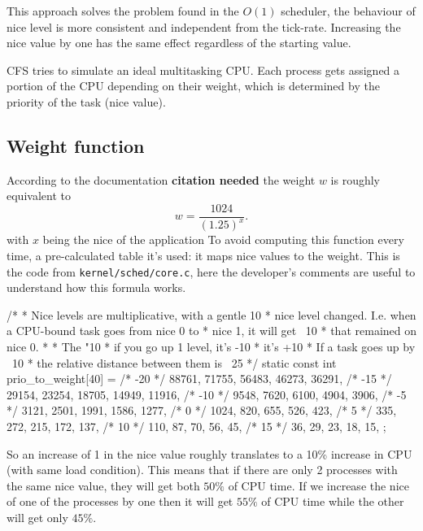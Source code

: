 \documentclass[10pt, oneside]{book}
\newcommand{\mycomment}[1]{\textbf{#1}}  %
\begin{document}
This approach solves the problem found in the $O(1)$ scheduler, the behaviour of nice level is more consistent and independent from the tick-rate. Increasing the nice value by one has the same effect regardless of the starting value.

CFS tries to simulate an ideal multitasking CPU. Each process gets
assigned a portion of the CPU depending on their weight, which is
determined by the priority of the task (nice value).

\subsection{Weight function}
According to the documentation \mycomment{citation needed} the weight
$w$ is roughly equivalent to
\begin{equation}
  w = \dfrac{1024}{(1.25)^{x}}.
  \label{eq:weight_nice}
\end{equation}
with $x$ being the nice of the application To avoid computing this
function every time, a pre-calculated table it's used: it maps nice
values to the weight. This is the code from
\verb|kernel/sched/core.c|, here the developer's comments are useful
to understand how this formula works.
\begin{code}
/*
 * Nice levels are multiplicative, with a gentle 10%
 * nice level changed. I.e. when a CPU-bound task goes from nice 0 to
 * nice 1, it will get ~10%
 * that remained on nice 0.
 *
 * The "10%
 * if you go up 1 level, it's -10%
 * it's +10%
 * If a task goes up by ~10%
 * the relative distance between them is ~25%
 */
static const int prio_to_weight[40] = {
/* -20 */ 88761, 71755, 56483, 46273, 36291,
/* -15 */ 29154, 23254, 18705, 14949, 11916,
/* -10 */ 9548, 7620, 6100, 4904, 3906,
/* -5 */ 3121, 2501, 1991, 1586, 1277,
/* 0 */ 1024, 820, 655, 526, 423,
/* 5 */ 335, 272, 215, 172, 137,
/* 10 */ 110, 87, 70, 56, 45,
/* 15 */ 36, 29, 23, 18, 15,
};
\end{code}
So an increase of 1 in the nice value roughly translates to a 10\% increase in CPU (with same load condition).%
This means that if there are only 2 processes with the same nice value, they will get both $50\%$ of CPU time. If we increase the nice of one of the processes by one then it will get $55\%$ of CPU time while the other will get only $45\%$.
\end{document}
